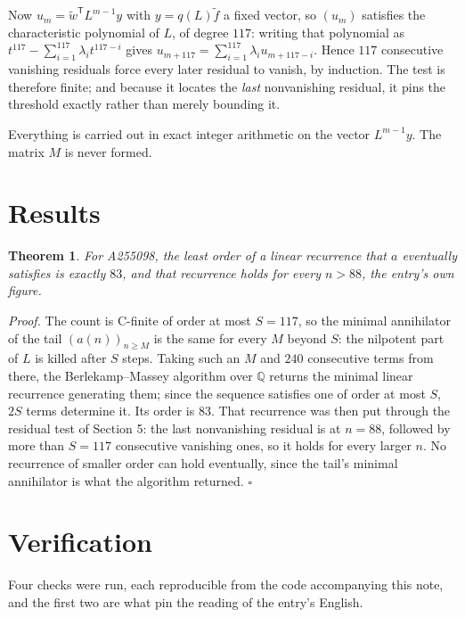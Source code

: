 \documentclass[11pt]{article}
\newtheorem{theorem}{Theorem}
\theoremstyle{definition}
\begin{document}
Now $u_m = \tilde w^{\mathsf T} L^{m-1} y$ with $y = q(L)\tilde f$ a fixed vector, so $(u_m)$ satisfies the characteristic polynomial of $L$, of degree $117$: writing that polynomial as $t^{117} - \sum_{i=1}^{117} \lambda_i t^{117-i}$ gives $u_{m+117} = \sum_{i=1}^{117} \lambda_i u_{m+117-i}$. Hence $117$ consecutive vanishing residuals force every later residual to vanish, by induction. The test is therefore finite; and because it locates the {\itshape last} nonvanishing residual, it pins the threshold exactly rather than merely bounding it.

Everything is carried out in exact integer arithmetic on the vector $L^{m-1}y$. The matrix $M$ is never formed.

\section{Results}

\begin{theorem} For A255098, the least order of a linear recurrence that $a$ eventually satisfies is exactly $83$, and that recurrence holds for every $n > 88$, the entry's own figure.\end{theorem}

{\itshape Proof.} The count is C-finite of order at most $S = 117$, so the minimal annihilator of the tail $(a(n))_{n \ge M}$ is the same for every $M$ beyond $S$: the nilpotent part of $L$ is killed after $S$ steps. Taking such an $M$ and $240$ consecutive terms from there, the Berlekamp--Massey algorithm over $\mathbb{Q}$ returns the minimal linear recurrence generating them; since the sequence satisfies one of order at most $S$, $2S$ terms determine it. Its order is $83$. That recurrence was then put through the residual test of Section 5: the last nonvanishing residual is at $n = 88$, followed by more than $S = 117$ consecutive vanishing ones, so it holds for every larger $n$. No recurrence of smaller order can hold eventually, since the tail's minimal annihilator is what the algorithm returned. $\square$

\section{Verification}

Four checks were run, each reproducible from the code accompanying this note, and the first two are what pin the reading of the entry's English.
\end{document}
